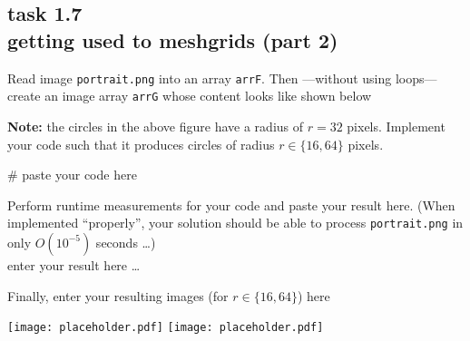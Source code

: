
\subsection*{task 1.7 \\[1ex] getting used to meshgrids (part 2)}

Read image \texttt{portrait.png} into an array \texttt{arrF}. Then ---without using  loops--- create an image array \texttt{arrG} whose content looks like shown below
\begin{figure}[h!]
\begin{center}
 \hfill
{}
\end{center}
\end{figure}

\textbf{Note:} the circles in the above figure have a radius of $r = 32$ pixels. Implement your code such that it produces circles of radius $r \in \{ 16, 64 \}$ pixels. \\[1ex]
\begin{python}
# paste your code here

\end{python}



\newpage
Perform runtime measurements for your code and paste your result here. (When implemented ``properly'', your solution should be able to process  \texttt{portrait.png} in only $O(10^{-5})$ seconds \ldots)
\color{blue} \\[1ex]
enter your result here \ldots
\color{black}



\vspace{4cm}
Finally, enter your resulting images (for $r \in \{ 16, 64 \}$) here
\begin{center}
\texttt{[image: placeholder.pdf]} \hfill
\texttt{[image: placeholder.pdf]} 
\end{center}






